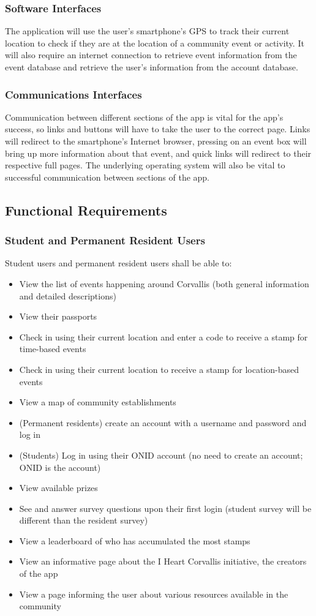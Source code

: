 \documentclass[draftclsnofoot, onecolumn, 10pt, compsoc]{IEEEtran}
\begin{document}
			\subsubsection{Software Interfaces}
				The application will use the user's smartphone's GPS to track their current location to check if they are at the location of a community event or activity. It will also require an internet connection to retrieve event information from the event database and retrieve the user's information from the account database.
			
			\subsubsection{Communications Interfaces}
				Communication between different sections of the app is vital for the app's success, so links and buttons will have to take the user to the correct page. Links will redirect to the smartphone's Internet browser, pressing on an event box will bring up more information about that event, and quick links will redirect to their respective full pages. The underlying operating system will also be vital to successful communication between sections of the app.
			
		\subsection{Functional Requirements}
			\subsubsection{Student and Permanent Resident Users}
				Student users and permanent resident users shall be able to:
				\begin{itemize}
					\item View the list of events happening around Corvallis (both general information and detailed descriptions)
					\item View their passports
					\item Check in using their current location and enter a code to receive a stamp for time-based events
					\item Check in using their current location to receive a stamp for location-based events
					\item View a map of community establishments
					\item (Permanent residents) create an account with a username and password and log in
					\item (Students) Log in using their ONID account (no need to create an account; ONID is the account)
					\item View available prizes
					\item See and answer survey questions upon their first login (student survey will be different than the resident survey)
					\item View a leaderboard of who has accumulated the most stamps
					\item View an informative page about the I Heart Corvallis initiative, the creators of the app
					\item View a page informing the user about various resources available in the community
				\end{itemize}
\end{document}
